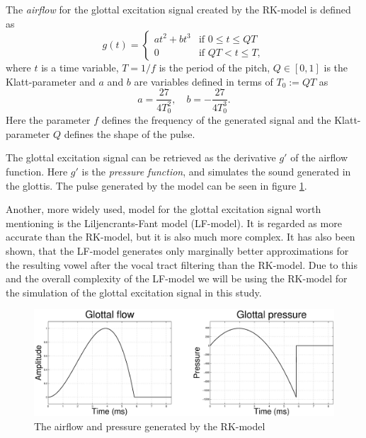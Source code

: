 \documentclass[12pt,a4]{article}
\begin{document}
The \emph{airflow} for the glottal excitation signal created by the RK-model is defined as
\begin{equation}
\label{eq:RK-model}
g(t) =
  \begin{cases}
   at^2 + bt^3  & \text{if } 0 \leq t \leq Q T \\
   0            & \text{if } Q T < t \leq T,
  \end{cases}
\end{equation}
where $t$ is a time variable, $T = 1/f$ is the period of the pitch, $Q \in \left[ 0,1 \right]$ is the Klatt-parameter and $a$ and $b$ are variables defined in terms of $T_0 := QT$ as
\begin{equation*}
a = \frac{27}{4 T_0^2}, \quad b = -\frac{27}{4 T_0^3} .
\end{equation*}
Here the parameter $f$ defines the frequency of the generated signal and the Klatt-parameter $Q$ defines the shape of the pulse.

The glottal excitation signal can be retrieved as the derivative $g'$ of the airflow function. Here $g'$ is the \emph{pressure function}, and simulates the sound generated in the glottis. The pulse generated by the model can be seen in figure \ref{fig:klatt}.

Another, more widely used, model for the glottal excitation signal worth mentioning is the Liljencrants-Fant model (LF-model).\cite{fant} It is regarded as more accurate than the RK-model, but it is also much more complex. It has also been shown, that the LF-model generates only marginally better approximations for the resulting vowel after the vocal tract filtering than the RK-model.\cite{fujisaki} Due to this and the overall complexity of the LF-model we will be using the RK-model for the simulation of the glottal excitation signal in this study.

\begin{figure}[t]
\begin{center}
\includegraphics[width=.8\textwidth]{img/klatt.eps}
\end{center}
\caption{The airflow and pressure generated by the RK-model}
\label{fig:klatt}
\end{figure}
\end{document}
